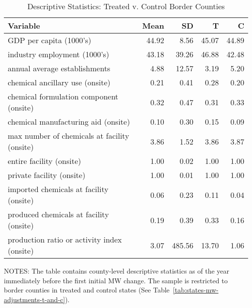 \begin{table}[H]
    \centering
    \caption{Descriptive Statistics: Treated v. Control Border Counties}
    \label{tab:descriptive-statistics-control-border-counties}
    \begin{tabular}{lrrrr}
        \toprule \toprule
        Variable                                     & Mean  & SD     & T     & C     \\ \midrule
        GDP per capita (1000's)                      & 44.92 & 8.56   & 45.07 & 44.89 \\
        industry employment (1000's)                 & 43.18 & 39.26  & 46.88 & 42.48 \\
        annual average establishments                & 4.88  & 12.57  & 3.19  & 5.20  \\
        chemical ancillary use (onsite)              & 0.21  & 0.41   & 0.28  & 0.20  \\
        chemical formulation component (onsite)      & 0.32  & 0.47   & 0.31  & 0.33  \\
        chemical manufacturing aid (onsite)          & 0.10  & 0.30   & 0.15  & 0.09  \\
        max number of chemicals at facility (onsite) & 3.86  & 1.52   & 3.86  & 3.87  \\
        entire facility (onsite)                     & 1.00  & 0.02   & 1.00  & 1.00  \\
        private facility (onsite)                    & 1.00  & 0.01   & 1.00  & 1.00  \\
        imported chemicals at facility (onsite)      & 0.06  & 0.23   & 0.11  & 0.04  \\
        produced chemicals at facility (onsite)      & 0.19  & 0.39   & 0.33  & 0.16  \\
        production ratio or activity index (onsite)  & 3.07  & 485.56 & 13.70 & 1.06  \\ \bottomrule\bottomrule
    \end{tabular}
    \begin{minipage}{13.5cm}
        \vspace{0.05in}
        \tiny NOTES: The table contains county-level descriptive statistics as of the year immediately before the first initial MW change. The sample is restricted to border counties in treated and control states (See Table~\ref{tab:states-mw-adjustments-t-and-c}).
    \end{minipage}
\end{table}
